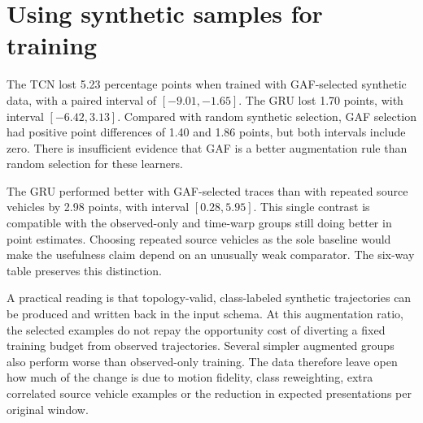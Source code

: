 \section{Using synthetic samples for training}
The TCN lost 5.23 percentage points when trained with GAF-selected synthetic data, with a paired interval of $[-9.01,-1.65]$. The GRU lost 1.70 points, with interval $[-6.42,3.13]$. Compared with random synthetic selection, GAF selection had positive point differences of 1.40 and 1.86 points, but both intervals include zero. There is insufficient evidence that GAF is a better augmentation rule than random selection for these learners.

The GRU performed better with GAF-selected traces than with repeated source vehicles by 2.98 points, with interval $[0.28,5.95]$. This single contrast is compatible with the observed-only and time-warp groups still doing better in point estimates. Choosing repeated source vehicles as the sole baseline would make the usefulness claim depend on an unusually weak comparator. The six-way table preserves this distinction.

A practical reading is that topology-valid, class-labeled synthetic trajectories can be produced and written back in the input schema. At this augmentation ratio, the selected examples do not repay the opportunity cost of diverting a fixed training budget from observed trajectories. Several simpler augmented groups also perform worse than observed-only training. The data therefore leave open how much of the change is due to motion fidelity, class reweighting, extra correlated source vehicle examples or the reduction in expected presentations per original window.


